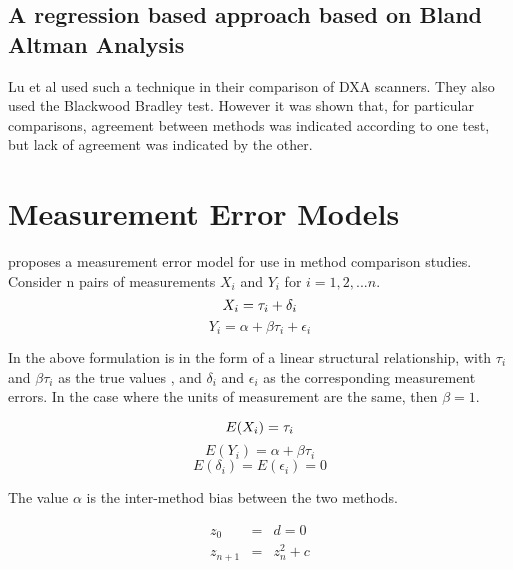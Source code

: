 \documentclass[12pt, a4paper]{report}
\begin{document}
\subsection{A regression based approach based on Bland Altman Analysis}
Lu et al used such a technique in their comparison of DXA
scanners. They also used the Blackwood Bradley test. However it
was shown that, for particular comparisons,  agreement between
methods was indicated according to one test, but lack of agreement
was indicated by the other.


\section{Measurement Error Models}
\citet{DunnSEME} proposes a measurement error model for use in
method comparison studies. Consider n pairs of measurements
$X_{i}$ and $Y_{i}$ for $i=1,2,...n$.
\begin{equation}
X_{i} = \tau_{i}+\delta_{i}\\
\end{equation}
\begin{equation}
 Y_{i} = \alpha +\beta\tau_{i}+\epsilon_{i} \nonumber
\end{equation}

In the above formulation is in the form of a linear structural
relationship, with $\tau_{i}$ and $\beta\tau_{i}$ as the true
values , and $\delta_{i}$ and $\epsilon_{i}$ as the corresponding
measurement errors. In the case where the units of measurement are
the same, then $\beta =1$.

\begin{equation}
E(X_{i}) = \tau_{i}\\
\end{equation}
\begin{equation}
E(Y_{i}) = \alpha +\beta\tau_{i} \nonumber
\end{equation}
\begin{equation}
E(\delta_{i}) = E(\epsilon_{i}) = 0 \nonumber
\end{equation}

The value $\alpha$ is the inter-method bias between the two
methods.

\begin{eqnarray}
  z_0 &=& d = 0 \\
  z_{n+1} &=& z_n^2+c
\end{eqnarray}

\end{document}

